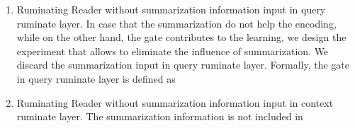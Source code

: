 \documentclass[11pt,letterpaper]{article}
\begin{document}
\begin{enumerate}
\item Ruminating Reader without summarization information input in query ruminate layer. In case that the summarization do not help the encoding, while on the other hand, the gate contributes to the learning, we design the experiment that allows to eliminate the influence of summarization. We discard the summarization input in query ruminate layer. Formally, the gate in query ruminate layer is defined as




\item Ruminating Reader without summarization information input in context ruminate layer. The summarization information is not included in 





\end{enumerate}

 
\end{document}
